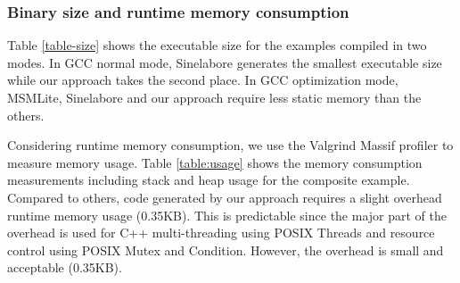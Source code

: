 \subsubsection{Binary size and runtime memory consumption} 
Table \ref{table-size} shows the executable size for the examples compiled in two modes.
In GCC normal mode, Sinelabore generates the smallest executable size while our approach takes the second place.
In GCC optimization mode, MSMLite, Sinelabore and our approach require less static memory than the others. 

Considering runtime memory consumption, we use the Valgrind Massif profiler \cite{Massif,nethercote2007valgrind} to measure memory usage. 
Table \ref{table:usage} shows the memory consumption measurements including stack and heap usage for the composite example. 
Compared to others, code generated by our approach requires a slight overhead runtime memory usage (0.35KB).
This is predictable since the major part of the overhead is used for C++ multi-threading using POSIX Threads and resource control using POSIX Mutex and Condition. 
However, the overhead is small and acceptable (0.35KB). 

